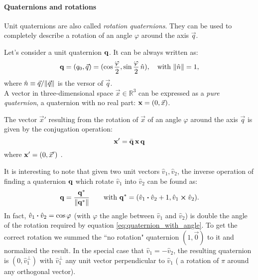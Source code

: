 \paragraph{Quaternions and rotations} Unit quaternions are also called \emph{rotation quaternions}.
They can be used to completely describe a rotation of an angle $\varphi$ around the axis $\vec q$.

Let's consider a unit quaternion $\mathbf{q}$. It can be always written as:
\begin{equation}
  \label{eq:quaternion_with_angle}
 \mathbf{q} = (q_0, \vec q) = (\cos \frac \varphi 2, \sin \frac \varphi 2\, \hat n), \quad \text{with } \norm{\hat n}=1,
\end{equation}
where $\hat n \equiv \vec q/\norm{\vec q}$ is the versor of $\vec q$.\\
A vector in three-dimensional space $\vec x \in \mathbb R^3$ can be expressed as a \emph{pure quaternion}, a quaternion with no real part: $\boldsymbol{\mathbf{x}} = (0, \vec x)$.

The vector $\vec x'$ resulting from the rotation of $\vec x$ of an angle $\varphi$ around the axis $\vec q$ is given by the conjugation operation:
\begin{equation}
\boldsymbol{\mathbf{x}}' = \bar{\mathbf{q}}\, \boldsymbol{\mathbf{x}} \, \mathbf{q}
\end{equation}
where $\boldsymbol{\mathbf{x}}' = (0, \vec x')$ \citep[for a proof, see e.g.][sec. 1.4]{Graf2008}.

It is interesting to note that given two unit vectors $\hat{v}_1, \hat{v}_2$, the inverse operation of finding a quaternion $\mathbf{q}$ which rotate $\hat{v}_1$ into $\hat{v}_2$ can be found as:
\begin{equation}
  \label{eq:quaternion_from_two_versors}
  \quat{q} = \frac{\quat{q^*}}{\norm{\quat{q^*}}}   \qquad \text{with }
  \quat{q^*} = (\hat{v}_1 \vdot \hat{v}_2 + 1, \hat{v}_1 \cross \hat{v}_2).
\end{equation}
In fact, $\hat{v}_1 \vdot \hat{v}_2 = \cos{\varphi}$ (with $\varphi$ the angle between  $\hat{v}_1$ and $\hat{v}_2$) is double the angle of the rotation required by equation \eqref{eq:quaternion_with_angle}.
To get the correct rotation we summed the ``no rotation" quaternion $(1, \vec 0)$ to it and normalized the result.
In the special case that $\hat{v}_1 = -\hat{v}_2$, the resulting quaternion is $(0, \hat{v}_1^\perp)$ with $\hat{v}_1^\perp$ any unit vector perpendicular to $\hat{v}_1$ (\ie{} a rotation of $\pi$ around any orthogonal vector).

